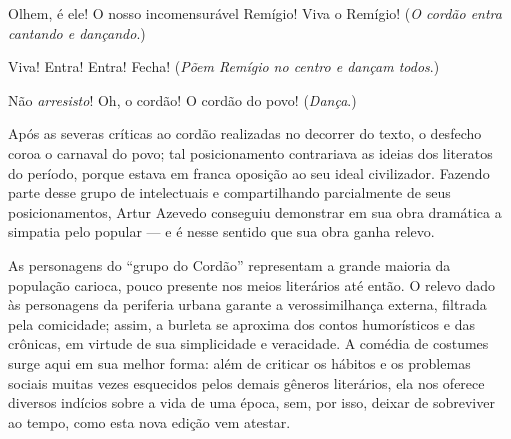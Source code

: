 \begin{hedraquote} 
 Olhem, é ele! O nosso incomensurável Remígio! Viva o
Remígio! (\textit{O cordão entra cantando e dançando}.)

 Viva! Entra! Entra! Fecha! (\textit{Põem Remígio no centro e
dançam todos}.)

 Não \textit{arresisto}! Oh, o cordão! O cordão do povo!
(\textit{Dança}.)
\end{hedraquote} 

Após as severas críticas ao cordão realizadas no decorrer do texto, o
desfecho coroa o carnaval do povo; tal posicionamento contrariava as
ideias dos literatos do período, porque estava em franca oposição ao
seu ideal civilizador. Fazendo parte desse grupo de intelectuais e
compartilhando parcialmente de seus posicionamentos, Artur Azevedo
conseguiu demonstrar em sua obra dramática a simpatia pelo popular --- e
é nesse sentido que sua obra ganha relevo. 

As personagens do “grupo do Cordão” representam a grande maioria da
população carioca, pouco presente nos meios literários até então. O
relevo dado às personagens da periferia urbana garante a
verossimilhança externa, filtrada pela comicidade; assim, a burleta se
aproxima dos contos humorísticos e das crônicas, em virtude de sua
simplicidade e veracidade. A comédia de costumes surge aqui em sua
melhor forma: além de criticar os hábitos e os problemas sociais muitas
vezes esquecidos pelos demais gêneros literários, ela nos oferece \enlargethispage{\baselineskip}
diversos indícios sobre a vida de uma época, sem, por isso, deixar de
sobreviver ao tempo, como esta nova edição vem atestar.

\pagebreak
